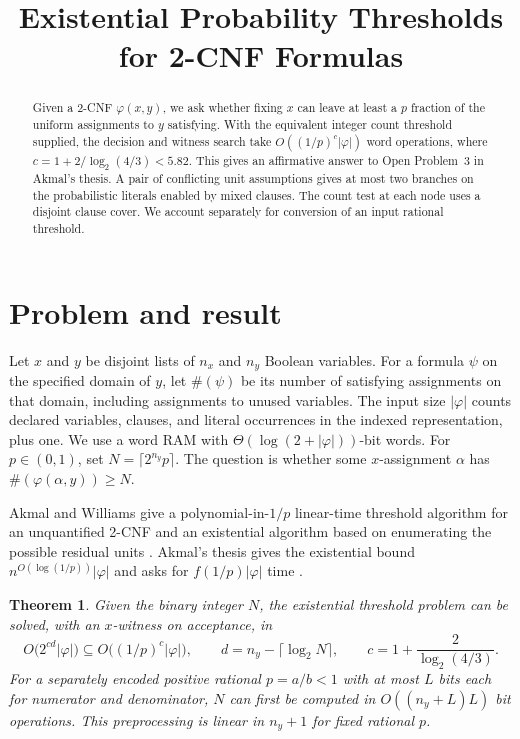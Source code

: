 \documentclass[11pt,a4paper]{amsart}
\title{Existential Probability Thresholds for 2-CNF Formulas}
\date{}
\newtheorem{theorem}{Theorem}
\newcommand{\size}{\lvert\varphi\rvert}
\newcommand{\countsat}[1]{\#(#1)}
\begin{document}
\begin{abstract}
Given a 2-CNF \(\varphi(x,y)\), we ask whether fixing \(x\) can leave at least a \(p\) fraction of the uniform assignments to \(y\) satisfying. With the equivalent integer count threshold supplied, the decision and witness search take \(O((1/p)^c\size)\) word operations, where \(c=1+2/\log_2(4/3)<5.82\). This gives an affirmative answer to Open Problem~3 in Akmal's thesis. A pair of conflicting unit assumptions gives at most two branches on the probabilistic literals enabled by mixed clauses. The count test at each node uses a disjoint clause cover. We account separately for conversion of an input rational threshold.
\end{abstract}
\maketitle

\section{Problem and result}
Let \(x\) and \(y\) be disjoint lists of \(n_x\) and \(n_y\) Boolean variables. For a formula \(\psi\) on the specified domain of \(y\), let \(\countsat{\psi}\) be its number of satisfying assignments on that domain, including assignments to unused variables. The input size \(\size\) counts declared variables, clauses, and literal occurrences in the indexed representation, plus one. We use a word RAM with \(\Theta(\log(2+\size))\)-bit words. For \(p\in(0,1)\), set \(N=\lceil 2^{n_y}p\rceil\). The question is whether some \(x\)-assignment \(\alpha\) has \(\countsat{\varphi(\alpha,y)}\ge N\).

Akmal and Williams give a polynomial-in-\(1/p\) linear-time threshold algorithm for an unquantified 2-CNF and an existential algorithm based on enumerating the possible residual units \cite[Theorems~3.1 and~6.1]{aw}. Akmal's thesis gives the existential bound \(n^{O(\log(1/p))}\size\) and asks for \(f(1/p)\size\) time \cite[Theorem~4.16 and Open Problem~3]{akmal}.

\begin{theorem}\label{thm:main}
Given the binary integer \(N\), the existential threshold problem can be solved, with an \(x\)-witness on acceptance, in
\[
 O\bigl(2^{cd}\size\bigr)\subseteq O\bigl((1/p)^c\size\bigr),
 \qquad d=n_y-\lceil\log_2 N\rceil,\qquad
 c=1+\frac{2}{\log_2(4/3)}.
\]
For a separately encoded positive rational \(p=a/b<1\) with at most \(L\) bits each for numerator and denominator, \(N\) can first be computed in \(O((n_y+L)L)\) bit operations. This preprocessing is linear in \(n_y+1\) for fixed rational \(p\).
\end{theorem}
\end{document}
